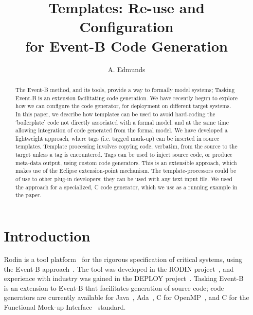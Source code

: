\documentclass{llncs}%
\begin{document}
%
\title{Templates: Re-use and Configuration\\ for Event-B Code Generation}

\author{A. Edmunds}


\maketitle
%
\begin{abstract}
The Event-B method, and  its tools, provide a way to formally model systems; Tasking Event-B is an extension facilitating code generation.  We have recently begun to explore how we can configure the code generator, for deployment on different target systems. In this paper, we describe how templates can be used to avoid hard-coding the `boilerplate' code not directly associated with a formal model, and at the same time allowing integration of code generated from the formal model. We have developed a lightweight approach, where tags (i.e. tagged mark-up) can be inserted in source templates. Template processing involves copying code, verbatim, from the source to the target unless a tag is encountered. Tags can be used to inject source code, or produce meta-data output, using custom code generators. This is an extensible approach, which makes use of the Eclipse extension-point mechanism. The template-processors could be of use to other plug-in developers; they can be used with any text input file. We used the approach for a specialized, C code generator, which we use as a running example in the paper. 
 \end{abstract}
%
%
\section{Introduction}
%
Rodin is a  tool platform~\cite{abrial10rodin} for the rigorous specification of critical systems, using the Event-B approach~\cite{ABR10}. The tool was developed in the RODIN project~\cite{RodinTool}, and experience with industry was gained in the DEPLOY project~\cite{DEPLOY}. Tasking Event-B~\cite{Edmunds2009,Edmunds2008,ae2011a,ae2012b} is an extension to Event-B that facilitates generation of source code; code generators are currently available for Java~\cite{JavaSpec}, Ada~\cite{ada2005}, C for OpenMP~\cite{openmp}, and C for the Functional Mock-up Interface~\cite{FMISTD} standard. 
\end{document}
